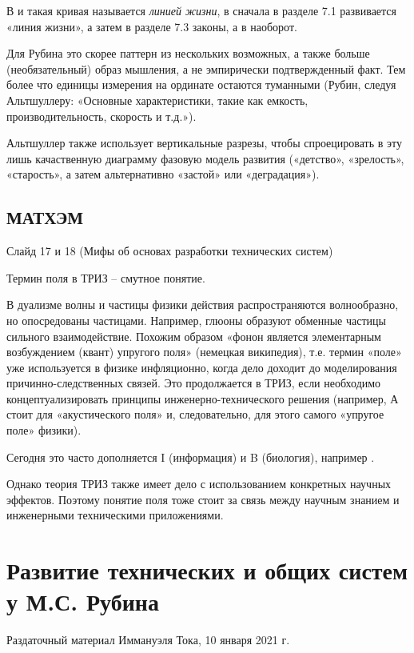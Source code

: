 \documentclass[a4paper,11pt]{article}
\begin{document}
В \cite{Altschuller1979} и \cite{Altschuller1980} такая кривая называется
\emph{линией жизни}, в \cite{Altschuller1979} сначала в разделе 7.1
развивается «линия жизни», а затем в разделе 7.3 законы, а в
\cite{Altschuller1980} наоборот.

Для Рубина это скорее паттерн из нескольких возможных, а также больше
(необязательный) образ мышления, а не эмпирически подтвержденный факт. 
Тем более что единицы измерения на ординате остаются туманными (Рубин, следуя
Альтшуллеру: «Основные характеристики, такие как емкость, производительность,
скорость и т.д.»).

Альтшуллер также использует вертикальные разрезы, чтобы спроецировать в эту
лишь качаственную диаграмму фазовую модель развития («детство», «зрелость»,
«старость», а затем альтернативно «застой» или «деградация»).

\subsection*{МАТХЭМ}

Слайд 17 и 18 (Мифы об основах разработки технических систем)

Термин поля в ТРИЗ -- смутное понятие.

В дуализме волны и частицы физики действия распространяются волнообразно, но
опосредованы частицами. Например, глюоны образуют обменные частицы сильного
взаимодействие. Похожим образом «фонон является элементарным возбуждением
(квант) упругого поля» (немецкая википедия), т.е. термин «поле» уже
используется в физике инфляционно, когда дело доходит до моделирования
причинно-следственных связей. Это продолжается в ТРИЗ, если необходимо
концептуализировать принципы инженерно-технического решения (например, А стоит
для «акустического поля» и, следовательно, для этого самого «упругое поле»
физики).

Сегодня это часто дополняется I (информация) и B (биология), например
\cite{Belski2016}.

Однако теория ТРИЗ также имеет дело с использованием конкретных научных
эффектов. Поэтому понятие поля тоже стоит за связь между научным знанием и
инженерными техническими приложениями.

\section{Развитие технических и общих систем у М.С. Рубина}

\begin{center}
  Раздаточный материал Иммануэля Тока, 10 января 2021 г.
\end{center}
\end{document}
